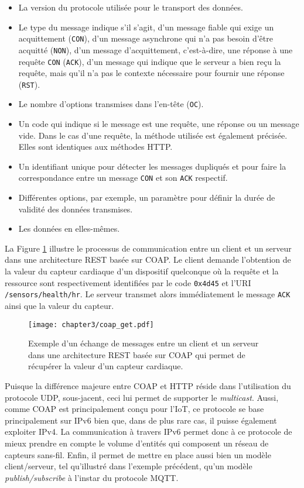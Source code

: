 \begin{itemize}[label=\textbullet]
    \item
        La version du protocole utilisée pour le transport des données.
    \item
        Le type du message indique s'il s'agit, d'un message fiable qui exige un acquittement (\texttt{CON}), d'un message asynchrone qui n'a pas besoin d'être acquitté (\texttt{NON}), d'un message d'acquittement, c'est-à-dire, une réponse à une requête \texttt{CON} (\texttt{ACK}), d'un message qui indique que le serveur a bien reçu la requête, mais qu'il n'a pas le contexte nécessaire pour fournir une réponse (\texttt{RST}).
    \item
        Le nombre d'options transmises dans l'en-tête (\texttt{OC}).
    \item
        Un code qui indique si le message est une requête, une réponse ou un message vide. Dans le cas d'une requête, la méthode utilisée est également précisée. Elles sont identiques aux méthodes \ac{HTTP}.
    \item
        Un identifiant unique pour détecter les messages dupliqués et pour faire la correspondance entre un message \texttt{CON} et son \texttt{ACK} respectif.
    \item
        Différentes options, par exemple, un paramètre pour définir la durée de validité des données transmises.
    \item
        Les données en elles-mêmes.
\end{itemize}

\noindent La Figure \ref{fig:coap_get} illustre le processus de communication entre un client et un serveur dans une architecture \ac{REST} basée sur \ac{COAP}. Le client demande l'obtention de la valeur du capteur cardiaque d'un dispositif quelconque où la requête et la ressource sont respectivement identifiées par le code \texttt{0x4d45} et l'\ac{URI} \texttt{/sensors/health/hr}. Le serveur transmet alors immédiatement le message \texttt{ACK} ainsi que la valeur du capteur.

\begin{figure}[H]
	\centering
	\texttt{[image: chapter3/coap\_get.pdf]}
        \caption{Exemple d'un échange de messages entre un client et un serveur dans une architecture \ac{REST} basée sur \ac{COAP} qui permet de récupérer la valeur d'un capteur cardiaque.}
	\label{fig:coap_get}
\end{figure}

Puisque la différence majeure entre \ac{COAP} et \ac{HTTP} réside dans l'utilisation du protocole \ac{UDP}, sous-jacent, ceci lui permet de supporter le \textit{multicast}. Aussi, comme \ac{COAP} est principalement conçu pour l'\acs{IoT}, ce protocole se base principalement sur IPv6 bien que, dans de plus rare cas, il puisse également exploiter IPv4. La communication à travers IPv6 permet donc à ce protocole de mieux prendre en compte le volume d'entités qui composent un réseau de capteurs sans-fil. Enfin, il permet de mettre en place aussi bien un modèle client/serveur, tel qu'illustré dans l'exemple précédent, qu'un modèle \textit{publish/subscribe} à l'instar du protocole \ac{MQTT}.

